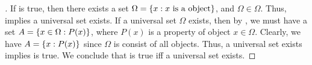 \begin{proof}[]
  If  is true, then there exists a set \(\Omega = \left\lbrace x : x \text{ is a object}\right\rbrace\), and \(\Omega \in \Omega\).
  Thus,  implies a universal set exists.
  If a universal set \(\Omega\) exists, then by , we must have a set \(A = \left\lbrace x \in \Omega : P(x)\right\rbrace\), where \(P(x)\) is a property of object \(x \in \Omega\).
  Clearly, we have \(A = \left\lbrace x : P(x)\right\rbrace\) since \(\Omega\) is consist of all objects.
  Thus, a universal set exists implies  is true.
  We conclude that  is true iff a universal set exists.
\end{proof}

